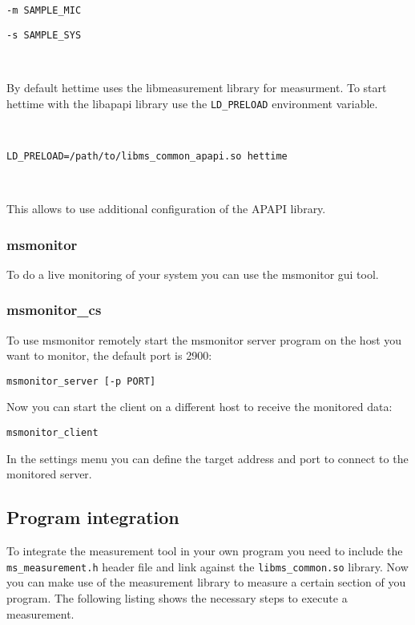 \verb+-m SAMPLE_MIC+

\verb+-s SAMPLE_SYS+

~

By default hettime uses the libmeasurement library for measurment.
To start hettime with the libapapi library use the \verb+LD_PRELOAD+ environment variable.

~

\verb+LD_PRELOAD=/path/to/libms_common_apapi.so hettime+

~

This allows to use additional configuration of the APAPI library.

\subsubsection{msmonitor}

To do a live monitoring of your system you can use the msmonitor gui tool.

\subsubsection{msmonitor\_cs}

To use msmonitor remotely start the msmonitor server program on the host you want to monitor, the default port is 2900:

\verb+msmonitor_server [-p PORT]+

Now you can start the client on a different host to receive the monitored data:

\verb+msmonitor_client+

In the settings menu you can define the target address and port to connect to the monitored server.

\subsection{Program integration}

To integrate the measurement tool in your own program you need to include the \verb+ms_measurement.h+ header file and link against the \verb+libms_common.so+ library.
Now you can make use of the measurement library to measure a certain section of you program.
The following listing shows the necessary steps to execute a measurement.

